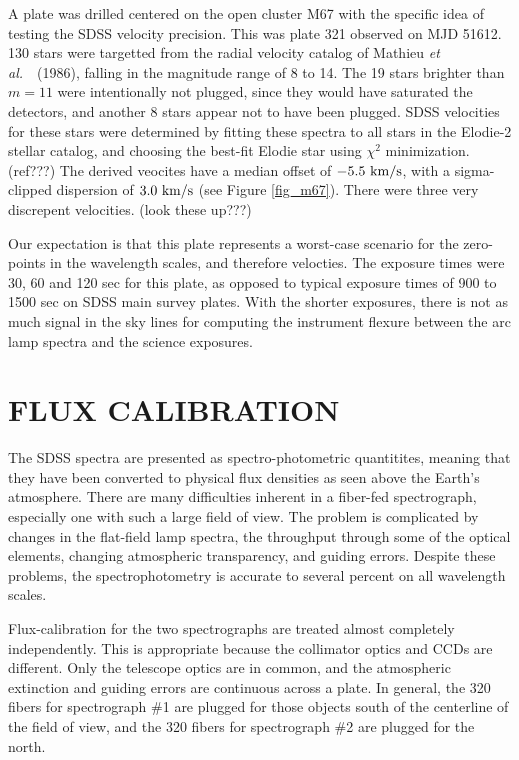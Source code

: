 \documentclass[12pt,preprint]{aastex}
\newcommand{\etal}{{\it et al.}~}
\newcommand{\kms}{{\rm ~km/s}}
\begin{document}
A plate was drilled centered on the open cluster M67 with the
specific idea of testing the SDSS velocity precision.
This was plate 321 observed on MJD 51612.  
130 stars were targetted from the radial velocity catalog
of Mathieu \etal\ (1986), falling in the magnitude range of 8 to 14.
The 19 stars brighter than $m=11$ were intentionally not plugged, since they
would have saturated the detectors, and another 8 stars appear not
to have been plugged.  SDSS velocities for these stars were determined
by fitting these spectra to all stars in the Elodie-2 stellar catalog,
and choosing the best-fit Elodie star using $\chi^2$ minimization.  (ref???)
The derived veocites have a median offset of $-5.5\kms$, with a sigma-clipped
dispersion of $3.0 \kms$ (see Figure \ref{fig_m67}).
There were three very discrepent velocities. (look these up???)

Our expectation is that this plate represents a worst-case scenario
for the zero-points in the wavelength scales, and therefore velocties.
The exposure times were 30, 60 and 120 sec for this plate, as opposed
to typical exposure times of 900 to 1500 sec on SDSS main survey plates.
With the shorter exposures, there is not as much signal in the sky lines
for computing the instrument flexure between the arc lamp spectra and
the science exposures.

\section{FLUX CALIBRATION}
\label{sec_fluxing}

The SDSS spectra are presented as spectro-photometric quantitites,
meaning that they have been converted to physical flux densities
as seen above the Earth's atmosphere.
There are many difficulties inherent in a fiber-fed spectrograph,
especially one with such a large field of view.
The problem is complicated by changes in the flat-field lamp spectra,
the throughput through some of the optical elements, changing
atmospheric transparency, and guiding errors.
Despite these problems, the spectrophotometry is accurate to
several percent on all wavelength scales.

Flux-calibration for the two spectrographs are treated almost completely
independently.  This is appropriate because the collimator optics
and CCDs are different.  Only the telescope optics are in common, and the
atmospheric extinction and guiding errors are continuous across a plate.
In general, the 320 fibers for spectrograph \#1 are plugged for those
objects south of the centerline of the field of view, and the 320 fibers
for spectrograph \#2 are plugged for the north.
\end{document}

